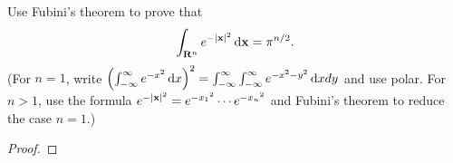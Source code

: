 \begin{problem}
Use Fubini's theorem to prove that
\[
\int_{\mathbf{R}^n}e^{-|\mathbf{x}|^2}\mathop{}\!\mathrm{d}\mathbf{x}=\pi^{n/2}.
\]
(For $n=1$, write $\left(\int_{-\infty}^\infty
e^{-x^2}\mathop{}\!\mathrm{d} x\right)^2=\int_{-\infty}^\infty\int_{-\infty}^\infty
e^{-x^2-y^2}\mathop{}\!\mathrm{d} xdy$
and use polar. For $n>1$, use the formula $e^{-|\mathbf{x}|^2}=e^{-{x_1}^2}\cdots
e^{-{x_n}^2}$ and Fubini's theorem to reduce the case $n=1$.)
\end{problem}
\begin{proof}
\end{proof}

